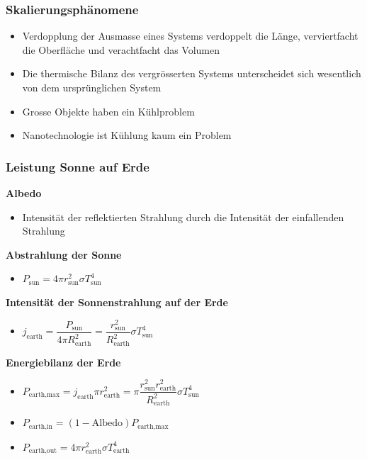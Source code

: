 \documentclass[8pt,a4paper]{scrartcl}
\begin{document}
\begin{multicols*}{3}
						\subsubsection{Skalierungsphänomene}
							\begin{itemize}\itemsep0pt
								\item Verdopplung der Ausmasse eines Systems verdoppelt die Länge, verviertfacht die Oberfläche und verachtfacht das Volumen
								\item Die thermische Bilanz des vergrösserten Systems unterscheidet sich wesentlich von dem ursprünglichen System
								\item Grosse Objekte haben ein Kühlproblem
								\item Nanotechnologie ist Kühlung kaum ein Problem
							\end{itemize}
							
						\subsubsection{Leistung Sonne auf Erde}
						
							\textbf{Albedo}
							\begin{itemize}\itemsep0pt
								\item Intensität der reflektierten Strahlung durch die Intensität der einfallenden Strahlung
							\end{itemize}	
							
							\textbf{Abstrahlung der Sonne}
							\begin{itemize}\itemsep0pt
								\item $P_{\text{sun}} = 4\pi r^{2}_{\text{sun}}\sigma T^{4}_{\text{sun}}$
							\end{itemize}	
							
							\textbf{Intensität der Sonnenstrahlung auf der Erde}
							\begin{itemize}\itemsep0pt
								\item $j_{\text{earth}}= \dfrac{P_{\text{sun}}}{4\pi R_{\text{earth}}^{2}} = \dfrac{r_{\text{sun}}^{2}}{R^{2}_{\text{earth}}}\sigma T^{4}_{\text{sun}}$
							\end{itemize}	
							
							\textbf{Energiebilanz der Erde}
							\begin{itemize}\itemsep0pt
								\item $P_{\text{earth,max}}=j_{\text{earth}}\pi r_{\text{earth}}^{2} = \pi \dfrac{r_{\text{sun}}^{2} r_{\text{earth}}^{2} }{R^{2}_{\text{earth}}}\sigma T^{4}_{\text{sun}}$
								\item $P_{\text{earth,in}}=(1-\text{Albedo})P_{\text{earth,max}}$
								\item $P_{\text{earth,out}}=4\pi r^{2}_{\text{earth}}\sigma T^{4}_{\text{earth}}$
							\end{itemize}	
							

\end{multicols*}
\end{document}
